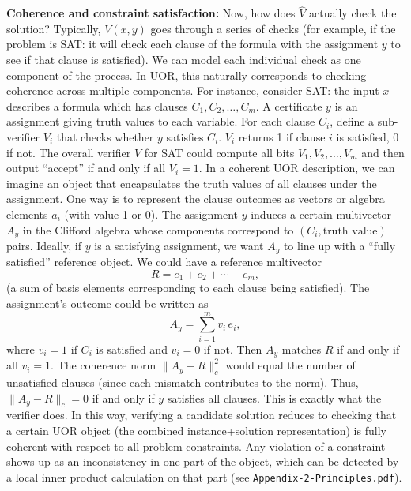 \documentclass[11pt]{article}
\begin{document}
\textbf{Coherence and constraint satisfaction:} Now, how does \(\hat{V}\) actually check the solution? Typically, \(V(x,y)\) goes through a series of checks (for example, if the problem is SAT: it will check each clause of the formula with the assignment \(y\) to see if that clause is satisfied). We can model each individual check as one component of the process. In UOR, this naturally corresponds to checking coherence across multiple components. For instance, consider SAT: the input \(x\) describes a formula which has clauses \(C_1, C_2, \dots, C_m\). A certificate \(y\) is an assignment giving truth values to each variable. For each clause \(C_i\), define a sub-verifier \(V_i\) that checks whether \(y\) satisfies \(C_i\). \(V_i\) returns 1 if clause \(i\) is satisfied, 0 if not. The overall verifier \(V\) for SAT could compute all bits \(V_1, V_2, \dots, V_m\) and then output “accept” if and only if all \(V_i=1\). In a coherent UOR description, we can imagine an object that encapsulates the truth values of all clauses under the assignment. One way is to represent the clause outcomes as vectors or algebra elements \(a_i\) (with value 1 or 0). The assignment \(y\) induces a certain multivector \(A_y\) in the Clifford algebra whose components correspond to \((C_i, \text{truth value})\) pairs. Ideally, if \(y\) is a satisfying assignment, we want \(A_y\) to line up with a “fully satisfied” reference object. We could have a reference multivector 
\[
R = e_1 + e_2 + \cdots + e_m,
\]
(a sum of basis elements corresponding to each clause being satisfied). The assignment’s outcome could be written as
\[
A_y = \sum_{i=1}^m v_i\, e_i,
\]
where \(v_i = 1\) if \(C_i\) is satisfied and \(v_i = 0\) if not. Then \(A_y\) matches \(R\) if and only if all \(v_i=1\). The coherence norm \(\|A_y - R\|_c^2\) would equal the number of unsatisfied clauses (since each mismatch contributes to the norm). Thus, \(\|A_y - R\|_c = 0\) if and only if \(y\) satisfies all clauses. This is exactly what the verifier does. In this way, verifying a candidate solution reduces to checking that a certain UOR object (the combined instance+solution representation) is fully coherent with respect to all problem constraints. Any violation of a constraint shows up as an inconsistency in one part of the object, which can be detected by a local inner product calculation on that part (see \texttt{Appendix-2-Principles.pdf}).
\end{document}
